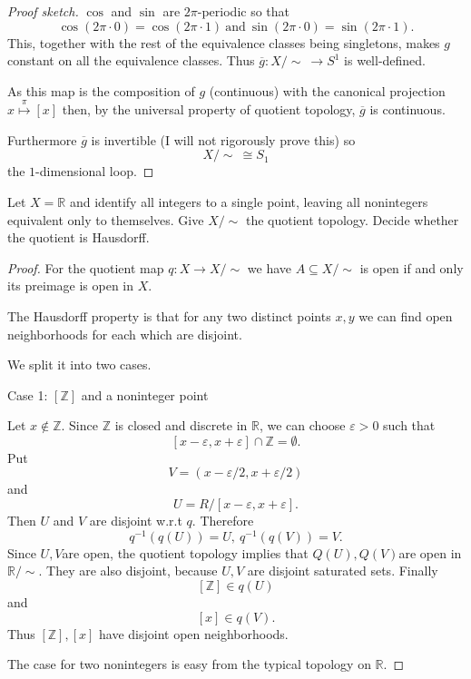 \documentclass[11pt]{article}
\begin{document}
\begin{proof}[Proof sketch]
    $\cos$ and $\sin$ are $2\pi$-periodic so that 
    \[
        \cos(2\pi \cdot 0) = \cos(2\pi \cdot 1) \ \text{and} 
        \ \sin(2\pi \cdot 0) = \sin(2\pi \cdot 1). 
    \]
    This, together with the rest of the equivalence classes 
    being singletons, makes $g$ constant on 
    all the equivalence classes. 
    Thus $\overline g : X / \sim \ \to S^1$ is well-defined. 
    
    As this map is the composition of 
    $g$ (continuous) 
    with the canonical projection $x \overset\pi\mapsto 
    [x]$ then, by the universal property of quotient topology, 
    $\overline g$ is continuous. 

    Furthermore $\overline g$ is invertible (I will not 
    rigorously prove this) so 
    \[
        X/ \sim \ \cong S_1
    \]
    the $1$-dimensional loop. 
\end{proof}

\begin{prob}
    Let $X = \mathbb R$ and identify 
    all integers to a single point, leaving all 
    nonintegers equivalent only to themselves. 
    Give $X / \sim$ the quotient topology. 
    Decide whether the quotient is Hausdorff. 
\end{prob}
\begin{proof}
    For the quotient map $q : X \to X/\sim$ we 
    have $A \subseteq X/\sim$ is open if and only 
    its preimage is open in $X$. 

    The Hausdorff property is that 
    for any two distinct points $x,y$ we can 
    find open neighborhoods for each which are disjoint.

    We split it into two cases. 

    Case 1: $[\mathbb Z]$ and a noninteger point 

    Let $x \not\in \mathbb Z$. Since $\mathbb Z$ is 
    closed and discrete in $\mathbb R$, we can choose 
    $\varepsilon > 0$ such that 
    \[
        [x - \varepsilon, x +\varepsilon] \cap 
        \mathbb Z = \emptyset. 
    \]
    Put 
    \[
        V = (x - \varepsilon/2, x + \varepsilon / 2)
    \]
    and
    \[
        U = R / [x - \varepsilon, x + \varepsilon].
    \]
    Then $U$ and $V$ are disjoint w.r.t $q$. 
    Therefore 
    \[
        q^{-1}(q(U)) = U, \ 
        q^{-1}(q(V)) = V. 
    \]
    Since $U,V$are open, the quotient topology 
    implies that $Q(U), Q(V)$are open in 
    $\mathbb R/ \sim$. 
    They are also disjoint, because $U,V$ are disjoint 
    saturated sets. Finally 
    \[
        [\mathbb Z] \in q(U)
    \]
    and 
    \[
        [x] \in q(V). 
    \]
    Thus $[\mathbb Z], [x]$ have disjoint open neighborhoods. 

    The case for two nonintegers is easy from 
    the typical topology on $\mathbb R$. 
\end{proof}
\end{document}
